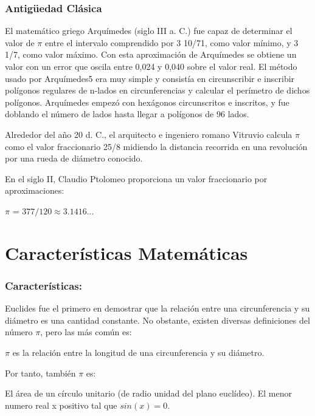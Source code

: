 \documentclass{beamer}
\begin{document}
\begin{frame}

\frametitle{\bf Antigüedad Clásica}

  
  El matemático griego Arquímedes (siglo III a. C.) fue capaz de determinar el valor de $\pi$ entre el intervalo comprendido por 3 10/71, como valor mínimo, y 3 1/7, como valor máximo. Con esta aproximación de Arquímedes se obtiene un valor con un error que oscila entre 0,024 y 0,040 sobre el valor real. El método usado por Arquímedes5 era muy simple y consistía en circunscribir e inscribir polígonos regulares de n-lados en circunferencias y calcular el perímetro de dichos polígonos. Arquímedes empezó con hexágonos circunscritos e inscritos, y fue doblando el número de lados hasta llegar a polígonos de 96 lados.

  Alrededor del año 20 d. C., el arquitecto e ingeniero romano Vitruvio calcula $\pi$ como el valor fraccionario 25/8 midiendo la distancia recorrida en una revolución por una rueda de diámetro conocido.
  \end{frame}
  
  \begin{frame}

  En el siglo II, Claudio Ptolomeo proporciona un valor fraccionario por aproximaciones:

  $\pi$ =  $377/120 \approx 3.1416... $
  

\end{frame}

\section{\bf Características Matemáticas}

\begin{frame}
\frametitle{Características:}

Euclides fue el primero en demostrar que la relación entre una circunferencia y su diámetro es una cantidad constante. No obstante, existen diversas definiciones del número $\pi$, pero las más común es:

    $\pi$ es la relación entre la longitud de una circunferencia y su diámetro.

  Por tanto, también $\pi$ es:

    El área de un círculo unitario (de radio unidad del plano euclídeo).
    El menor numero real x positivo tal que $sin(x) = 0$.
\end{frame}
\end{document}
